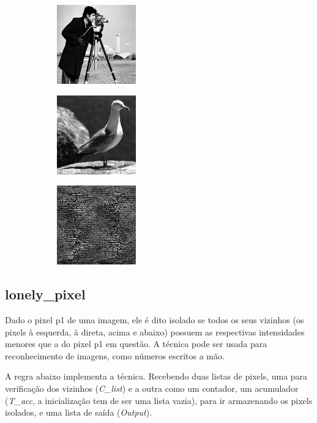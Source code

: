\documentclass{article}
\begin{document}
        \begin{figure}[h]
        \centering
            \begin{subfigure}
            \centering
            \includegraphics[width=139px, height=129px]{images/cameraman.jpg}
            \end{subfigure}
            \begin{subfigure}
            \centering
            \includegraphics[width=139px, height=129px]{images/gull.jpg}
            \end{subfigure}
            \begin{subfigure}
            \centering
            \includegraphics[width=139px, height=129px]{images/cameraman_gull_mean.jpg}
            \end{subfigure}
        \end{figure}    
        
    \newpage
    \subsection*{lonely\_pixel}
        Dado o pixel p1 de uma imagem, ele é dito isolado se todos os seus vizinhos (os pixels à esquerda, à direta, acima e abaixo) possuem as respectivas intensidades menores que a do pixel p1 em questão. A técnica pode ser usada para reconhecimento de imagens, como números escritos a mão.

        A regra abaixo implementa a técnica. Recebendo duas listas de pixels, uma para verificação dos vizinhos (\textit{C\_list}) e a outra como um contador, um acumulador (\textit{T\_acc}, a inicialização tem de ser uma lista vazia), para ir armazenando os pixels isolados, e uma lista de saída (\textit{Output}).
        
\end{document}

